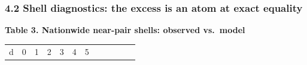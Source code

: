 \documentclass[
  11pt,
]{article}
\newcounter{none} %
\begin{document}
\subsubsection{4.2 Shell diagnostics: the excess is an atom at exact
equality}\label{shell-diagnostics-the-excess-is-an-atom-at-exact-equality}

\textbf{Table 3. Nationwide near-pair shells: observed vs.~model}

{\def\LTcaptype{none} %
\begin{longtable}[]{@{}
  >{\raggedright\arraybackslash}p{}
  >{\raggedright\arraybackslash}p{}
  >{\raggedright\arraybackslash}p{}
  >{\raggedright\arraybackslash}p{}
  >{\raggedright\arraybackslash}p{}
  >{\raggedright\arraybackslash}p{}
  >{\raggedright\arraybackslash}p{}
  >{\raggedright\arraybackslash}p{}
  >{\raggedright\arraybackslash}p{}
  >{\raggedright\arraybackslash}p{}
  >{\raggedright\arraybackslash}p{}
  >{\raggedright\arraybackslash}p{}@{}}
\toprule\noalign{}
\begin{minipage}[b]{\linewidth}\raggedright
d
\end{minipage} & \begin{minipage}[b]{\linewidth}\raggedright
0
\end{minipage} & \begin{minipage}[b]{\linewidth}\raggedright
1
\end{minipage} & \begin{minipage}[b]{\linewidth}\raggedright
2
\end{minipage} & \begin{minipage}[b]{\linewidth}\raggedright
3
\end{minipage} & \begin{minipage}[b]{\linewidth}\raggedright
4
\end{minipage} & \begin{minipage}[b]{\linewidth}\raggedright
5
\end{minipage} & \begin{minipage}[b]{\linewidth}\raggedright

\end{minipage}
\end{longtable}}
\end{document}
